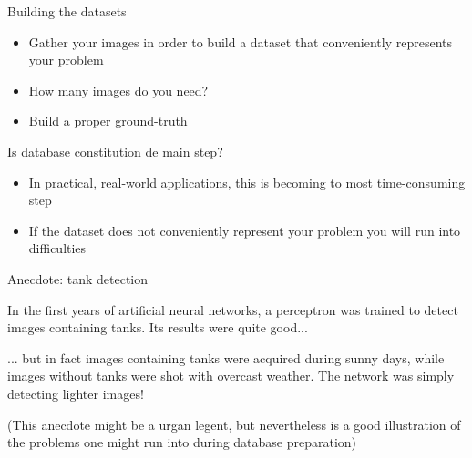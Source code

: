 \documentclass[xcolor=pdftex,dvipsnames,table,mathserif]{beamer}
\begin{document}
\begin{frame}{Building the datasets}
  \begin{itemize}
  \item Gather your images in order to build a dataset that conveniently represents your problem
  \item How many images do you need?
  \item Build a proper ground-truth
  \end{itemize}

  \begin{alertblock}{Is database constitution de main step?}
    \begin{itemize}
    \item In practical, real-world applications, this is becoming to most time-consuming step
    \item If the dataset does not conveniently represent your problem you will run into difficulties
    \end{itemize}

\end{alertblock}

\end{frame}

\begin{frame}{Anecdote: tank detection}

  In the first years of artificial neural networks, a perceptron was trained to detect images containing tanks. Its results were quite good...

  \pause

  ... but in fact images containing tanks were acquired during sunny days, while images without tanks were shot with overcast weather. The network was simply detecting lighter images!

  \pause

  (This anecdote might be a urgan legent, but nevertheless is a good illustration of the problems one might run into during database preparation)
\end{frame}

\end{document}
